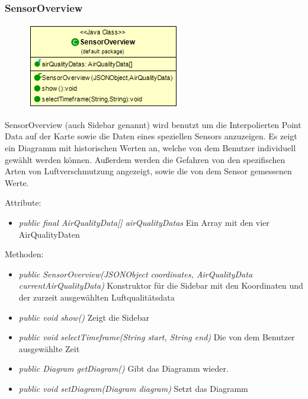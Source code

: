\subsubsection{SensorOverview}
\begin{minipage}{0.3\textwidth}
    \begin{figure}[H]
        {\centering\includegraphics[scale = 0.5
        ]{media/view/map/SensorOverview_Class.png}}
    \end{figure}
    \end{minipage} \hfill
    \begin{minipage}{0.6\textwidth}
SensorOverview (auch Sidebar genannt) wird benutzt um die Interpolierten Point Data auf der Karte sowie die Daten eines speziellen Sensors anzuzeigen. Es zeigt ein Diagramm mit historischen Werten an, welche von dem Benutzer individuell gewählt werden können. Außerdem werden die Gefahren von den spezifischen Arten von Luftverschmutzung angezeigt, sowie die von dem Sensor gemessenen Werte.
\end{minipage}
\vspace{\baselineskip}
Attribute: \begin{itemize} [noitemsep]
    \item \emph{public final AirQualityData[] airQualityDatas} Ein Array mit den vier AirQualityDaten
\end{itemize}
Methoden: \begin{itemize} [noitemsep]
    \item \emph{public SensorOverview(JSONObject coordinates, AirQualityData currentAirQualityData)} Konstruktor für die Sidebar mit den Koordinaten und der zurzeit ausgewählten Luftqualitätsdata
    \item \emph{public void show()} Zeigt die Sidebar
    \item \emph{public void selectTimeframe(String start, String end)} Die von dem Benutzer ausgewählte Zeit
    \item \emph{public Diagram getDiagram()} Gibt das Diagramm wieder.
    \item \emph{public void setDiagram(Diagram diagram)} Setzt das Diagramm
\end{itemize}

